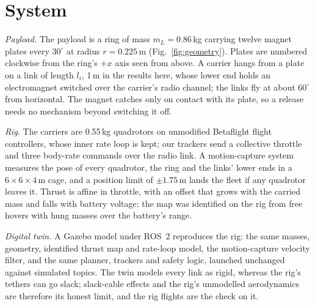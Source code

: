 \section{System}
\label{sec:system}

\emph{Payload.} The payload is a ring of mass $m_L = 0.86$\,kg carrying twelve magnet plates every $30^\circ$ at
radius $r = 0.225$\,m (Fig.~\ref{fig:geometry}). Plates are numbered clockwise from the ring's $+x$ axis seen from
above. A carrier hangs from a plate on a link of length $l_i$, 1\,m in the results here, whose lower end holds an
electromagnet switched over the carrier's radio channel; the links fly at about $60^\circ$ from horizontal. The
magnet catches only on contact with its plate, so a release needs no mechanism beyond switching it off.

\emph{Rig.} The carriers are 0.55\,kg quadrotors on unmodified Betaflight flight controllers, whose inner rate loop
is kept; our trackers send a collective throttle and three body-rate commands over the radio link. A motion-capture
system measures the pose of every quadrotor, the ring and the links' lower ends in a $6\times6\times4$\,m cage, and a
position limit of $\pm1.75$\,m lands the fleet if any quadrotor leaves it. Thrust is affine in throttle, with an
offset that grows with the carried mass and falls with battery voltage; the map was identified on the rig from free
hovers with hung masses over the battery's range.

\emph{Digital twin.} A Gazebo \cite{koenig2004gazebo} model under ROS~2 \cite{macenski2022ros2} reproduces the
rig: the same masses, geometry, identified thrust map and rate-loop model, the motion-capture velocity filter, and
the same planner, trackers and safety logic, launched unchanged against simulated topics. The twin models every link
as rigid, whereas the rig's tethers can go slack; slack-cable effects and the rig's unmodelled aerodynamics are
therefore its honest limit, and the rig flights are the check on it.
